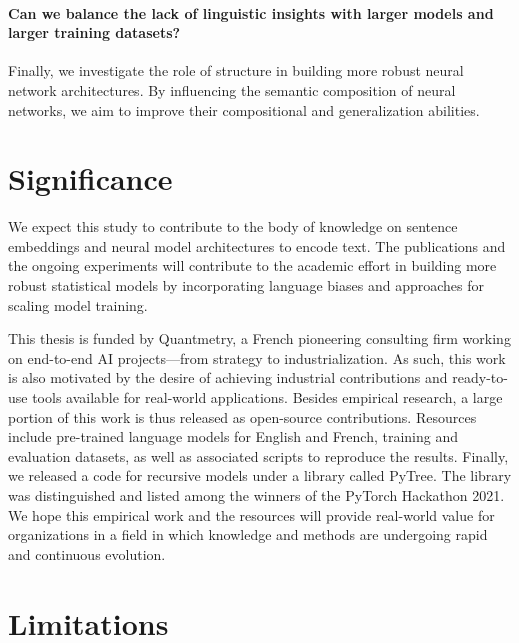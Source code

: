 \paragraph{Can we balance the lack of linguistic insights with larger models and larger training datasets?}

Finally, we investigate the role of structure in building more robust neural network architectures. By influencing the semantic composition of neural networks, we aim to improve their compositional and generalization abilities.

\section{Significance}


We expect this study to contribute to the body of knowledge on sentence embeddings and neural model architectures to encode text. The publications and the ongoing experiments will contribute to the academic effort in building more robust statistical models by incorporating language biases and approaches for scaling model training. 

This thesis is funded by Quantmetry, a French pioneering consulting firm working on end-to-end AI projects—from strategy to industrialization. As such, this work is also motivated by the desire of achieving industrial contributions and ready-to-use tools available for real-world applications. Besides empirical research, a large portion of this work is thus released as open-source contributions. Resources include pre-trained language models for English and French, training and evaluation datasets, as well as associated scripts to reproduce the results. Finally, we released a code for recursive models under a library called PyTree. The library was distinguished and listed among the winners of the PyTorch Hackathon 2021. We hope this empirical work and the resources will provide real-world value for organizations in a field in which knowledge and methods are undergoing rapid and continuous evolution.

\section{Limitations}

